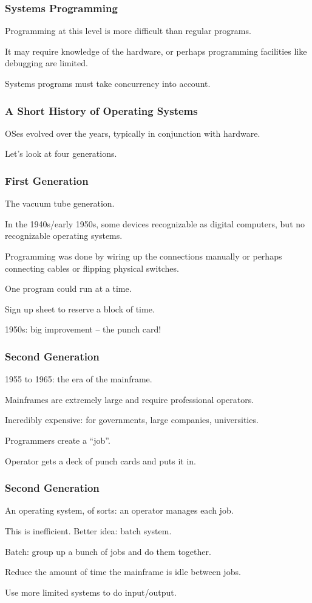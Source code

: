 \begin{frame}
\frametitle{Systems Programming}

Programming at this level is more difficult than regular programs. 

It may require knowledge of the hardware, or perhaps programming facilities like debugging are limited. 

Systems programs must take concurrency into account.

\end{frame}

\begin{frame}
\frametitle{A Short History of Operating Systems}

OSes evolved over the years, typically in conjunction with hardware.

Let's look at four generations.

\end{frame}

\begin{frame}
\frametitle{First Generation}

The vacuum tube generation.

In the 1940s/early 1950s, some devices recognizable as digital computers, but no recognizable operating systems.

Programming was done by wiring up the connections manually or perhaps connecting cables or flipping physical switches.

One program could run at a time.

Sign up sheet to reserve a block of time.

1950s: big improvement -- the punch card!

\end{frame}

\begin{frame}
\frametitle{Second Generation}
1955 to 1965: the era of the mainframe.

Mainframes are extremely large and require professional operators.

Incredibly expensive: for governments, large companies, universities.

Programmers create a ``job''.

Operator gets a deck of punch cards and puts it in.

\end{frame}

\begin{frame}
\frametitle{Second Generation}

An operating system, of sorts: an operator manages each job.

This is inefficient. Better idea: \alert{batch system}.

Batch: group up a bunch of jobs and do them together.

Reduce the amount of time the mainframe is idle between jobs.

Use more limited systems to do input/output.

\end{frame}


